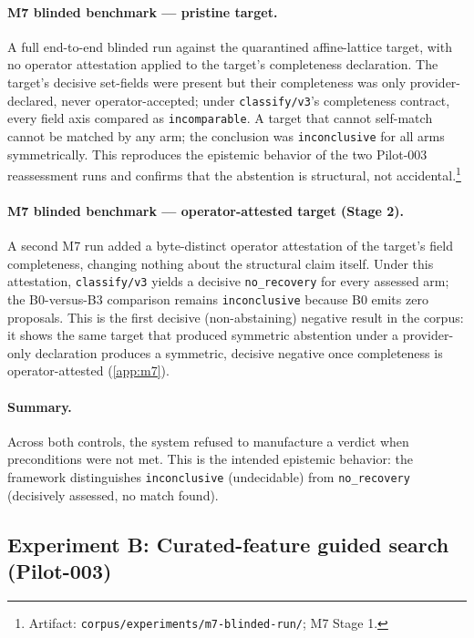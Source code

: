 \documentclass[11pt]{article}
\theoremstyle{gowthm}
\theoremstyle{gowplain}
\begin{document}
\paragraph{M7 blinded benchmark --- pristine target.}
A full end-to-end blinded run against the quarantined affine-lattice target,
with no operator attestation applied to the target's completeness declaration.
The target's decisive set-fields were present but their completeness was only
provider-declared, never operator-accepted; under \texttt{classify/v3}'s
completeness contract, every field axis compared as \texttt{incomparable}.
A target that cannot self-match cannot be matched by any arm; the conclusion was
\texttt{inconclusive} for all arms symmetrically. This reproduces the epistemic
behavior of the two Pilot-003 reassessment runs and confirms that the abstention
is structural, not accidental.\footnote{Artifact: \texttt{corpus/experiments/m7-blinded-run/}; M7 Stage 1.}

\paragraph{M7 blinded benchmark --- operator-attested target (Stage 2).}
A second M7 run added a byte-distinct operator attestation of the target's
field completeness, changing nothing about the structural claim itself. Under
this attestation, \texttt{classify/v3} yields a decisive
\texttt{no\_recovery} for every assessed arm; the B0-versus-B3 comparison
remains \texttt{inconclusive} because B0 emits zero proposals. This is the
first decisive (non-abstaining) negative result in the corpus: it shows the
same target that produced symmetric abstention under a provider-only
declaration produces a symmetric, decisive negative once completeness is
operator-attested (\cref{app:m7}).

\paragraph{Summary.}
Across both controls, the system refused to manufacture a verdict when
preconditions were not met. This is the intended epistemic behavior: the
framework distinguishes \texttt{inconclusive} (undecidable) from
\texttt{no\_recovery} (decisively assessed, no match found).

\subsection{Experiment B: Curated-feature guided search (Pilot-003)}
\label{sec:results-pilot003}
\end{document}
